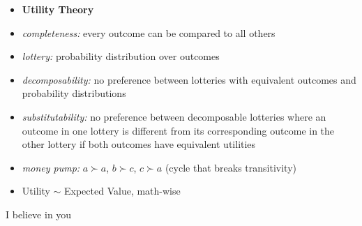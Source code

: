 \documentclass[11pt,landscape]{memoir}
\begin{document}
\begin{multicols}{2}
\begin{itemize}
    \item \textbf{Utility Theory}
    \item \textit{completeness:} every outcome can be compared to all others
    \item \textit{lottery:} probability distribution over outcomes
    \item \textit{decomposability:} no preference between lotteries with equivalent outcomes and probability distributions
    \item \textit{substitutability:} no preference between decomposable lotteries where an outcome in one lottery is different from its corresponding outcome in the other lottery if both outcomes have equivalent utilities
    \item \textit{money pump:} $a \succ a$, $b \succ c$, $c \succ a$ (cycle that breaks transitivity)
    \item Utility $\sim$ Expected Value, math-wise
\end{itemize}



\end{multicols}

\tiny{I believe in you}
\end{document}
